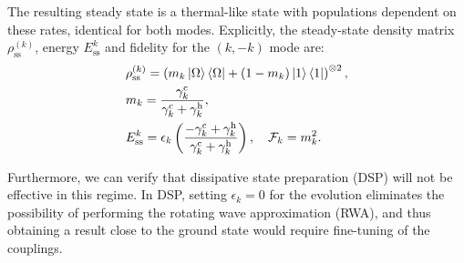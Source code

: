 The resulting steady state is a thermal-like state with populations dependent on these rates, identical for both modes. Explicitly, the steady-state density matrix $\rho_{\text{ss}}^{(k)}$, energy $E_{\text{ss}}^k$ and fidelity for the $(k,-k)$ mode are:
\begin{align}
     &\rho_{\text{ss}}^{(k)} = \left( m_k \ket{\Omega}\bra{\Omega} + (1 - m_k) \ket{1}\bra{1} \right)^{\otimes 2},\\
     &m_k = \frac{\gamma_k^{\rm c}}{\gamma_k^{\rm c} + \gamma_k^{\rm h}}, \label{eq:ss_density_matrix}\\
     &E_{\text{ss}}^k = \epsilon_k \left( \frac{-\gamma_k^{\rm c} +\gamma_k^{\rm h}}{\gamma_k^{\rm c} + \gamma_k^{\rm h}} \right),\quad \mathcal{F}_k=m_k^2.
    \label{eq:avg_longtime_ss_app}
\end{align}


Furthermore, we can verify that dissipative state preparation (DSP) will not be effective in this regime. In DSP, setting $\epsilon_k = 0$ for the evolution eliminates the possibility of performing the rotating wave approximation (RWA), and thus obtaining a result close to the ground state would require fine-tuning of the couplings.


